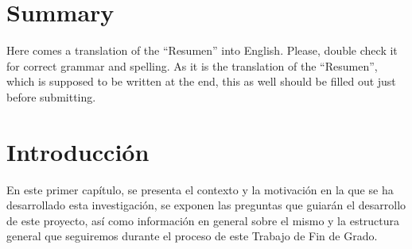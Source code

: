 \documentclass[a4paper, 12pt]{book}
\begin{document}

\chapter*{Summary}

Here comes a translation of the ``Resumen'' into English. 
Please, double check it for correct grammar and spelling.
As it is the translation of the ``Resumen'', which is supposed to be written at the end, this as well should be filled out just before submitting.




\tableofcontents 
\cleardoublepage
\listoffigures %



\cleardoublepage
\chapter{Introducción}
\label{chap:introducción}
\label{sec:intro} %


En este primer capítulo, se presenta el contexto y la motivación en la que se ha desarrollado esta investigación, se exponen las preguntas que guiarán el desarrollo de este proyecto, así como información en general sobre el mismo y la estructura general que seguiremos durante el proceso de este Trabajo de Fin de Grado.
\end{document}
